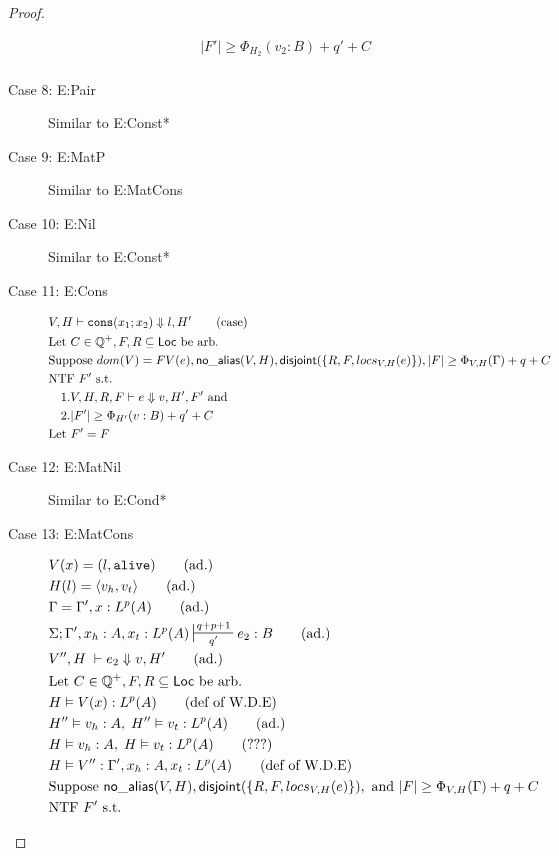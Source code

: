 \documentclass[11pt]{article}
\newcommand{\ms}[1]{\ensuremath{\mathsf{#1}}}
\newcommand{\irl}[1]{\mathtt{#1}}
\newcommand{\na}[1]{\mathsf{no\_alias}(#1)}
\newcommand{\dist}[1]{\mathsf{disjoint}(#1)}
\theoremstyle{definition}
\begin{document}
\begin{proof}
\begin{description}
\begin{align*}
  &|F'| \ge \Phi_{H_2}(v_2:B) + q' + C \tag{from IH}\\
  \end{align*}
	\item[Case 8: E:Pair]
  Similar to E:Const*
  \item[Case 9: E:MatP]
  Similar to E:MatCons
  \item[Case 10: E:Nil]
  Similar to E:Const*
  \item[Case 11: E:Cons]
  \begin{align*}
  &V,H \vdash \consexabt{x_1}{x_2} \Downarrow l, H' \tag{case}\\
  &\text{Let } C \in \mathbb{Q}^+, F,R \subseteq \ms{Loc} \text{ be arb.}\\
  &\text{Suppose } dom(V) = FV(e), \na{V,H}, \dist{\{R,F,locs_{V,H}(e)\}}, |F| \ge \Phi_{V,H}(\Gamma) + q + C\\
  &\text{NTF } F' \text{ s.t. }\\
  &\quad 1. V,H,R,F \vdash e \Downarrow v, H',F' \text{ and }\\ 
  &\quad 2. |F'| \ge \Phi_{H'}(v:B) + q' + C\\
  &\text{Let } F' = F \ 
  \end{align*}
  \item[Case 12: E:MatNil]
  Similar to E:Cond*
  \item[Case 13: E:MatCons]
  \begin{align*}
  &V(x) = (l,\irl{alive}) \tag{ad.}\\
  &H(l) = \pairexcst{v_h}{v_t} \tag{ad.}\\
  &\Gamma = \Gamma', x : L^p(A) \tag{ad.}\\
  &\Sigma; \Gamma', x_h : A, x_t : L^p(A) \sststile{q'}{q + p + 1} e_2 : B \tag{ad.}\\
  &V'',H \; \vdash e_2 \Downarrow v, H' \tag{ad.}\\
  &\text{Let } C \in \mathbb{Q}^+, F,R \subseteq \ms{Loc} \text{ be arb.}\\
  &H \vDash V(x) : L^p(A) \tag{def of W.D.E}\\
  &H''\vDash v_h : A,\; H'' \vDash v_t : L^p(A) \tag{ad.}\\
  &H\vDash v_h : A,\; H \vDash v_t : L^p(A) \tag{???}\\
  &H \vDash V'' : \Gamma', x_h : A, x_t : L^p(A) \tag{def of W.D.E}\\
  &\text{Suppose }  \na{V,H}, \dist{\{R,F,locs_{V,H}(e)\}}, \text{ and } |F| \ge \Phi_{V,H}(\Gamma) + q + C\\
  &\text{NTF } F' \text{ s.t. }\\

\end{align*}
\end{description}
\end{proof}
\end{document}
